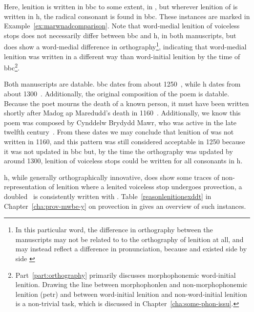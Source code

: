 Here,  lenition is written in \gls{bbc} to some extent, \eg in , but wherever lenition  of  is written in \gls{h}, the radical consonant is found in \gls{bbc}. These instances are marked in Example~\ref{ex:marwnadcomparison}. Note that word-medial lenition of voiceless stops does not necessarily differ between \gls{bbc} and \gls{h}, \cf {} in both manuscripts, but  does show a word-medial difference in orthography\footnote{In this particular word, the difference in orthography between the manuscripts may not be related to to the orthography of lenition at all, and may instead reflect a difference in pronunciation, because  and  existed side by side \autocite[s.v.~\textit{cydymaith}]{bevan_geiriadur_2014}}, indicating that word-medial lenition was written in a different way than word-initial lenition by the time of \gls{bbc}\footnote{Part~\ref{part:orthography} primarily discusses morphophonemic word-initial lenition. Drawing the line between \gls{morphophonlen} and non-morphophonemic lenition (\gls{petr}) and between  word-initial lenition and non-word-initial lenition is a non-trivial task, which is discussed in Chapter~\ref{cha:some-phon-issu}.}.

Both manuscripts are datable. \Gls{bbc} dates from about 1250~\autocite[xxiv]{jones_rhagymadrodd_1982}, while \gls{h} dates from about 1300~\autocite{huws_llawysgrif_1981}. Additionally, the original composition of the poem is datable. Because the poet mourns the death of a known person, it must have been written shortly after Madog ap Maredudd's death in 1160~\autocite[82]{jones_gwaith_1991}. Additionally, we know this poem was composed by Cynddelw Brydydd Mawr, who was active in the late twelfth century~\autocite[xxx]{jones_gwaith_1991}. From these dates we may conclude that lenition of  was  not written in 1160, and this pattern was still considered acceptable in 1250 because it was not updated in \gls{bbc} but, by the time the orthography was updated by around 1300, lenition of voiceless stops could be written for all consonants in  \gls{h}.

\Gls{h}, while generally orthographically innovative, does show some traces of non-representation of lenition where a lenited voiceless stop undergoes provection, \ie a doubled \lT\ is consistently written with . Table~\ref{reasonlenitionexddt}   in Chapter~\ref{cha:prov-mwbe-y} on provection in  gives an overview of such instances.

